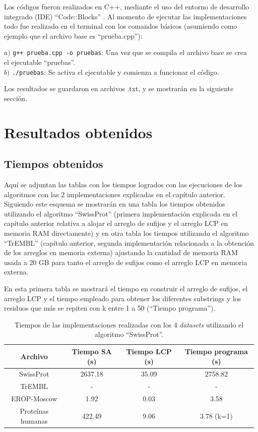 Los códigos fueron realizados en C++, mediante el uso del entorno de desarrollo integrado (IDE) ``Code::Blocks'' \cite{codeblocks}. Al momento de ejecutar las implementaciones todo fue realizado en el terminal con los comandos básicos (asumiendo como ejemplo que el archivo base es ``prueba.cpp''):

$a)$ \texttt{g++ prueba.cpp -o pruebas}: Una vez que se compila el archivo base se crea el ejecutable ``pruebas''.\\
$b)$ \texttt{./pruebas}: Se activa el ejecutable y comienza a funcionar el código.

Los resultados se guardaron en archivos .txt, y se mostrarán en la siguiente sección.

\section{Resultados obtenidos}

\subsection{Tiempos obtenidos}

Aquí se adjuntan las tablas con los tiempos logrados con las ejecuciones de los algoritmos con las 2 implementaciones explicadas en el capítulo anterior. Siguiendo este esquema se mostrarán en una tabla los tiempos obtenidos utilizando el algoritmo ``SwissProt'' (primera implementación explicada en el capítulo anterior relativa a alojar el arreglo de sufijos y el arreglo LCP en memoria RAM directamente) y en otra tabla los tiempos utilizando el algoritmo ``TrEMBL'' (capítulo anterior, segunda implementación relacionada a la obtención de los arreglos en memoria externa) ajustando la cantidad de memoria RAM usada a 20 GB para tanto el arreglo de sufijos como el arreglo LCP en memoria externa. 

En esta primera tabla se mostrará el tiempo en construir el arreglo de sufijos, el arreglo LCP y el tiempo empleado para obtener los diferentes substrings y los residuos que más se repiten con k entre 1 a 50 (``Tiempo programa'').

\begin{table}[h]
\centering
\begin{tabular}{|c|c|c|c|}
\hline
\textbf{Archivo}  & \textbf{Tiempo SA (s)} & \textbf{Tiempo LCP (s)} & \textbf{Tiempo programa (s)} \\ \hline
SwissProt         & 2637.18                & 35.09                   & 2758.82                         \\
TrEMBL            & -                & -                &        -                  \\
EROP-Moscow       & 1.92                   & 0.03                    & 3.58                         \\
Proteínas humanas & 422.49                 & 9.06                    & 3.78 (k=1)                         \\ \hline
\end{tabular}
\caption{Tiempos de las implementaciones realizadas con los 4 \textit{datasets} utilizando el algoritmo ``SwissProt''.}
\label{tb:labelr3}
\end{table}


